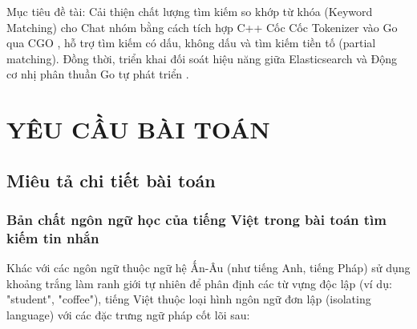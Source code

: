 \documentclass[12pt,a4paper,oneside]{report}
\begin{document}
Mục tiêu đề tài: Cải thiện chất lượng tìm kiếm so khớp từ khóa (Keyword Matching) cho Chat nhóm bằng cách tích hợp C++ Cốc Cốc Tokenizer \cite{ref5} vào Go qua CGO \cite{ref6}, hỗ trợ tìm kiếm có dấu, không dấu và tìm kiếm tiền tố (partial matching). Đồng thời, triển khai đối soát hiệu năng giữa Elasticsearch \cite{ref4} và Động cơ nhị phân thuần Go tự phát triển \cite{ref3}.

\chapter{YÊU CẦU BÀI TOÁN}

\section{Miêu tả chi tiết bài toán}

\subsection{Bản chất ngôn ngữ học của tiếng Việt trong bài toán tìm kiếm tin nhắn}
Khác với các ngôn ngữ thuộc ngữ hệ Ấn-Âu (như tiếng Anh, tiếng Pháp) sử dụng khoảng trắng làm ranh giới tự nhiên để phân định các từ vựng độc lập (ví dụ: "student", "coffee"), tiếng Việt thuộc loại hình ngôn ngữ đơn lập (isolating language) với các đặc trưng ngữ pháp cốt lõi sau:
\end{document}

